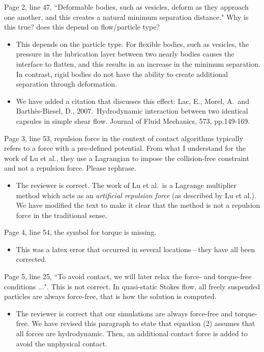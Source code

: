 \documentclass[11pt]{article}
\newcommand{\comment}[1]{{\color{blue} #1}}
\begin{document}
\noindent
\comment{Page 2, line 47, ``Deformable bodies, such as vesicles, deform as
they approach one another, and this creates a natural minimum separation
distance." Why is this true?  does this depend on flow/particle type?}
\begin{itemize}
  \item This depends on the particle type.  For flexible bodies, such as
    vesicles, the pressure in the lubrication layer between two nearly
    bodies causes the interface to flatten, and this results in an
    increase in the minimum separation.  In contrast, rigid bodies do
    not have the ability to create additional separation through
    deformation.

  \item We have added a citation that discusses this effect: \newline
    Lac, E., Morel, A.~and Barthès-Biesel, D., 2007.~Hydrodynamic
    interaction between two identical capsules in simple shear flow.
    Journal of Fluid Mechanics, 573, pp.149-169.

\end{itemize}

\noindent
\comment{Page 3, line 53, repulsion force in the context of contact
  algorithms typically refers to a force with a pre-defined potential.
  From what I understand for the work of Lu et al., they use a
  Lagrangian to impose the collision-free constraint and not a repulsion
  force.  Please rephrase.}
\begin{itemize}
  \item The reviewer is correct.  The work of Lu et al.~is a Lagrange
    multiplier method which acts as an {\em artificial repulsion force}
    (as described by Lu et al.).  We have modified the text to make it
    clear that the method is not a repulsion force in the traditional
    sense.
\end{itemize}

\noindent
\comment{Page 4, line 54, the symbol for torque is missing.}
\begin{itemize}
  \item This was a latex error that occurred in several locations---they
    have all been corrected.
\end{itemize}

\noindent
\comment{Page 5, line 25, ``To avoid contact, we will later relax the
  force- and torque-free conditions ...".  This is not correct.  In
  quasi-static Stokes flow, all freely suspended particles are always
  force-free, that is how the solution is computed.}
\begin{itemize}
  \item The reviewer is correct that our simulations are always
    force-free and torque-free.  We have revised this paragraph to state
    that equation (2) assumes that all forces are hydrodynamic.  Then,
    an additional contact force is added to avoid the unphysical
    contact.
\end{itemize}
\end{document}
